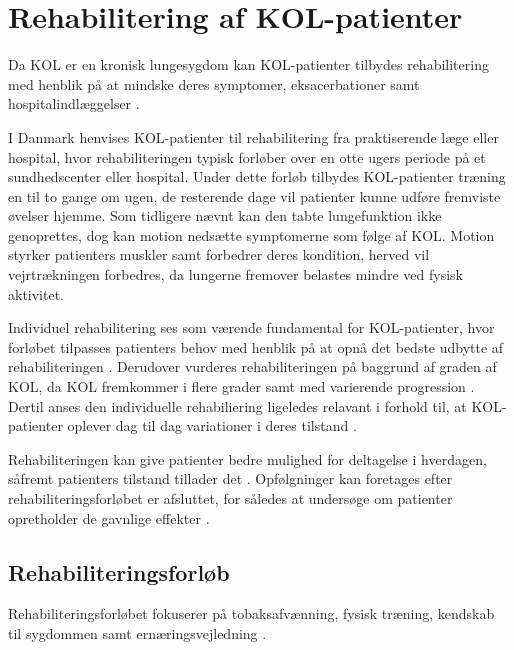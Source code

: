 \section{Rehabilitering af KOL-patienter} \label{sec:rehabilitering}
Da KOL er en kronisk lungesygdom kan KOL-patienter tilbydes rehabilitering med henblik på at mindske deres symptomer, eksacerbationer samt hospitalindlæggelser \cite{Hellem2012,Williams2014}. 

I Danmark henvises KOL-patienter til rehabilitering fra praktiserende læge eller hospital, hvor rehabiliteringen typisk forløber over en otte ugers periode på et sundhedscenter eller hospital. Under dette forløb tilbydes KOL-patienter træning en til to gange om ugen, de resterende dage vil patienter kunne udføre fremviste øvelser hjemme.\cite{McCarthy2015,Frausing2011b} Som tidligere nævnt kan den tabte lungefunktion ikke genoprettes, dog kan motion nedsætte symptomerne som følge af KOL. Motion styrker patienters muskler samt forbedrer deres kondition, herved vil vejrtrækningen forbedres, da lungerne fremover belastes mindre ved fysisk aktivitet.\cite{Lungeforeningen2016}

Individuel rehabilitering ses som værende fundamental for KOL-patienter, hvor forløbet tilpasses patienters behov med henblik på at opnå det bedste udbytte af rehabiliteringen \cite{McCarthy2015,Habraken2011,Sundhedsstyrelsen2015}. Derudover vurderes rehabiliteringen på baggrund af graden af KOL, da KOL fremkommer i flere grader samt med varierende progression \cite{McCarthy2015}. Dertil anses den individuelle rehabiliering ligeledes relavant i forhold til, at KOL-patienter oplever dag til dag variationer i deres tilstand \cite{Hellem2012}. 

Rehabiliteringen kan give patienter bedre mulighed for deltagelse i hverdagen, såfremt patienters tilstand tillader det \cite{McCarthy2015,Habraken2011, Sundhedsstyrelsen2015}. Opfølgninger kan foretages efter rehabiliteringsforløbet er afsluttet, for således at undersøge om patienter opretholder de gavnlige effekter \cite{Frausing2011b}.


\subsection{Rehabiliteringsforløb}
Rehabiliteringsforløbet fokuserer på tobaksafvænning, fysisk træning, kendskab til sygdommen samt ernæringsvejledning \cite{McCarthy2015,Habraken2011,Sundhedsstyrelsen2015}.

